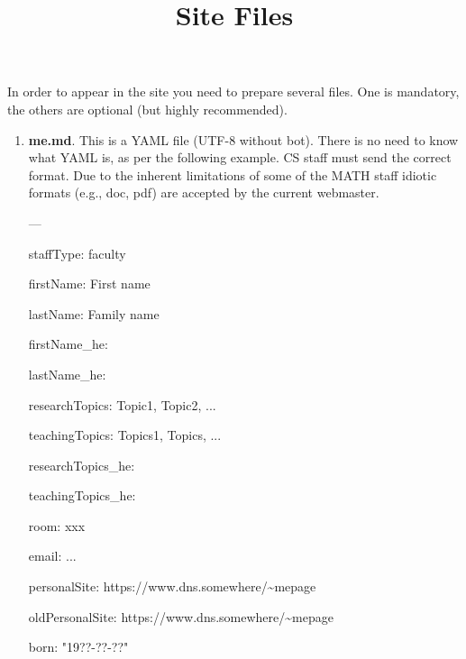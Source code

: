 \documentclass{article}
\title{Site Files}
\begin{document}
\maketitle
In order to appear in the site you need to prepare several files.
One is mandatory, the others are optional (but highly recommended).
\begin{enumerate}
\item
	{\bf me.md}. 
	This is a YAML file (UTF-8 without bot).
	 There is no need to know what YAML is, as per the following example.
	CS staff must send the correct format.
	Due to the inherent limitations of some of the MATH staff idiotic formats (e.g., doc, pdf) are accepted
	by the current webmaster.
	\begin{tt}

---

\textvisiblespace \textvisiblespace \textvisiblespace staffType: faculty

\textvisiblespace \textvisiblespace \textvisiblespace firstName: First name

\textvisiblespace \textvisiblespace \textvisiblespace lastName: Family name

\textvisiblespace \textvisiblespace \textvisiblespace firstName\_he: 

\textvisiblespace \textvisiblespace \textvisiblespace lastName\_he: 

\textvisiblespace \textvisiblespace \textvisiblespace researchTopics: Topic1, Topic2, ...

\textvisiblespace \textvisiblespace \textvisiblespace teachingTopics: Topics1, Topics, ...

\textvisiblespace \textvisiblespace \textvisiblespace researchTopics\_he: 

\textvisiblespace \textvisiblespace \textvisiblespace teachingTopics\_he:

\textvisiblespace \textvisiblespace \textvisiblespace room: xxx

\textvisiblespace \textvisiblespace \textvisiblespace email: ...

\textvisiblespace \textvisiblespace \textvisiblespace personalSite: https://www.dns.somewhere/\textasciitilde mepage

\textvisiblespace \textvisiblespace \textvisiblespace oldPersonalSite: https://www.dns.somewhere/\textasciitilde mepage

\textvisiblespace \textvisiblespace \textvisiblespace born: "19??-??-??"


\end{tt}
\end{enumerate}
\end{document}

